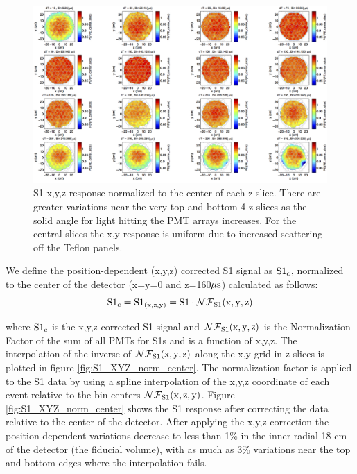 \renewcommand{\baselinestretch}{1}
\small\normalsize
\begin{figure}\centering
\includegraphics[width=230mm]{Chapter_XYZ_Corr/Thesis_Corr_Plots/S1_XYZ_Kr_norm_center_slice_crop.png}
\caption{S1 x,y,z response normalized to the center of each z slice. There are greater variations near the very top and bottom 4 z slices as the solid angle for light hitting the PMT arrays increases. For the central slices the x,y response is uniform due to increased scattering off the Teflon panels. }
\label{fig:S1_XYZ_norm_center_slice}
\end{figure}
\renewcommand{\baselinestretch}{2}
\small\normalsize

\newpage

We define the position-dependent  (x,y,z) corrected S1 signal as $\rm S1{_c}$, normalized to the center of the detector (x=y=0 and z=160$\rm \mu s$) calculated as follows:
\begin{equation}
\rm S1_{c}= S1_{(x,z,y)}=S1 \cdot \mathcal{NF}_{S1}(x,y,z)
\label{eq:S1_XYZ}
\end{equation}

\noindent where $\rm S1_{c}$ is the x,y,z corrected S1 signal and $\rm \mathcal{NF}_{S1}(x,y,z)$ is the Normalization Factor of the sum of all PMTs for S1s and is a function of x,y,z. The interpolation of the inverse of $\rm \mathcal{NF}_{S1}(x,y,z)$ along the x,y grid in z slices is plotted in figure \ref{fig:S1_XYZ_norm_center}. The normalization factor is applied to the S1 data by using a spline interpolation of the x,y,z coordinate of each event relative to the bin centers $\rm \mathcal{NF}_{S1}(x,z,y)$. Figure \ref{fig:S1_XYZ_norm_center} shows the S1 response after correcting the data relative to the center of the detector. After applying the x,y,z correction the position-dependent variations decrease to less than 1\% in the inner radial 18 cm of the detector (the fiducial volume), with as much as 3\% variations near the top and bottom edges where the interpolation fails.

